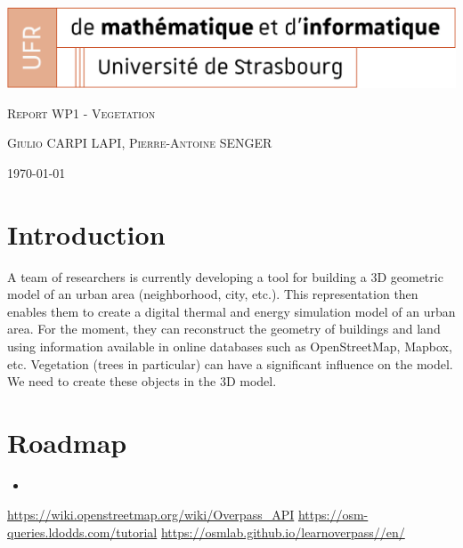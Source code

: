 \documentclass[11pt]{article}
\begin{document}
\begin{titlepage}
    \centering
    \includegraphics[width=1\textwidth]{images/logo_Uni.png}\par\vspace{1cm}
    {\scshape\Large Report WP1 - Vegetation \par}
    \vspace{1cm}
    {\scshape\large Giulio CARPI LAPI, Pierre-Antoine SENGER\par}
    \vspace{1cm}
    {\large \today\par}
\end{titlepage}
 
\tableofcontents %

\newpage %

\section{Introduction}

A team of researchers is currently developing a tool for building a 3D geometric model of an urban area (neighborhood, city, etc.).
This representation then enables them to create a digital thermal and energy simulation model of an urban area.
For the moment, they can reconstruct the geometry of buildings and land using information available in online databases such as OpenStreetMap, Mapbox, etc.
Vegetation (trees in particular) can have a significant influence on the model. We need to create these objects in the 3D model.

\section{Roadmap}
\begin{itemize}
	\item 
\end{itemize}

\begin{thebibliography}{9}
     \url{https://wiki.openstreetmap.org/wiki/Overpass_API}
	 \url{https://osm-queries.ldodds.com/tutorial}
	 \url{https://osmlab.github.io/learnoverpass//en/}

\end{thebibliography}
\end{document}
